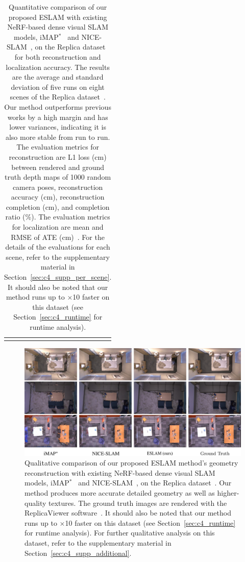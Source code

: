 \begin{table}[t]
\begin{center}
\begin{tabular}{l|cccc}
            \Xhline{2\arrayrulewidth}
        \end{tabular}
    \end{center}
    \caption{Quantitative comparison of our proposed ESLAM with existing NeRF-based dense visual SLAM models, iMAP$^{*}$~\citep{sucar2021imap} and NICE-SLAM~\citep{zhu2022nice}, on the Replica dataset~\citep{replica19arxiv} for both reconstruction and localization accuracy. The results are the average and standard deviation of five runs on eight scenes of the Replica dataset~\citep{replica19arxiv}. Our method outperforms previous works by a high margin and has lower variances, indicating it is also more stable from run to run. The evaluation metrics for reconstruction are L1 loss (cm) between rendered and ground truth depth maps of 1000 random camera poses, reconstruction accuracy (cm), reconstruction completion (cm), and completion ratio (\%). The evaluation metrics for localization are mean and RMSE of ATE (cm)~\citep{sturm2012benchmark}. For the details of the evaluations for each scene, refer to the supplementary material in Section~\ref{sec:c4_supp_per_scene}. It should also be noted that our method runs up to $\times$10 faster on this dataset (see Section~\ref{sec:c4_runtime} for runtime analysis).}
    \label{table:quantitative_replica}
\end{table}

\begin{figure}[t]
    \begin{center}
        \includegraphics[width=1.0\linewidth]{images/chapter4/figures/Fig3.jpg}
    \end{center}
    \caption{Qualitative comparison of our proposed ESLAM method's geometry reconstruction with existing NeRF-based dense visual SLAM models, iMAP$^*$~\citep{sucar2021imap} and NICE-SLAM~\citep{zhu2022nice}, on the Replica dataset~\citep{replica19arxiv}. Our method produces more accurate detailed geometry as well as higher-quality textures. The ground truth images are rendered with the ReplicaViewer software~\citep{replica19arxiv}. It should also be noted that our method runs up to $\times$10 faster on this dataset (see Section~\ref{sec:c4_runtime} for runtime analysis). For further qualitative analysis on this dataset, refer to the supplementary material in Section~\ref{sec:c4_supp_additional}.}
    \label{fig:c4_qualitative_replica}
\end{figure}

